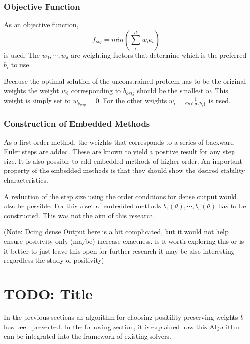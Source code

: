 \documentclass[a4paper]{scrartcl}
\numberwithin{equation}{section}
\theoremstyle{plain}
\theoremstyle{definition}
\numberwithin{theorem}{section}
\newcommand{\1}{\mathbbm{1}}
\begin{document}
\subsubsection{Objective Function}

As an objective function,
\begin{equation}
f_{obj} = min \left(\sum_i^d w_i a_i \right)
\end{equation}
is used.  The $w_1,\cdots,w_d$ are weighting factors that determine which is the preferred $b_i$ to use.

Because the optimal solution of the unconstrained problem has to be the original weights the weight $w_0$ corresponding to $b_{orig}$ should be the smallest $w$. This weight is simply set to $w_{b_{orig}} = 0$. For the other weights $w_i = \frac{1}{\mathrm{Order} \{b_i\}}$ is used.

\subsubsection{Construction of Embedded Methods}

As a first order method, the weights that corresponds to a series of backward Euler steps are added. These are known to yield a positive result for any step size.
It is also possible to add embedded methods of higher order.
An important property of the embedded methods is that they should show the desired stability characteristics. 

A reduction of the step size using the order conditions for dense output would also be possible. For this a set of embedded methods $b_1(\theta),\cdots,b_d(\theta)$ has to be constructed. This was not the aim of this research.

(Note: Doing dense Output here is a bit complicated, but it would not help ensure positivity only (maybe) increase exactness.  is it worth exploring this or is it better to just leave this open for further research it may be also interesting regardless the study of positivity)
 
\section{TODO: Title} \label{sec:integration}

In the previous sections an algorithm for choosing positifity preserving weights $\tilde{b}$ has been presented. 
In the following section, it is explained how this Algorithm can be integrated into the framework of existing solvers.
\end{document}
